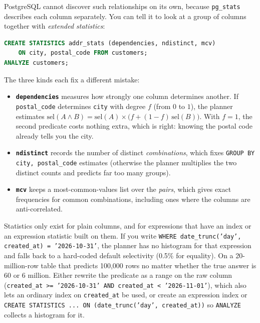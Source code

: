 PostgreSQL cannot discover such relationships on its own, because \texttt{pg\_stats} describes each column separately. You can tell it to look at a group of columns together with \emph{extended statistics}:

\begin{lstlisting}[language=SQL]
CREATE STATISTICS addr_stats (dependencies, ndistinct, mcv)
    ON city, postal_code FROM customers;
ANALYZE customers;
\end{lstlisting}

The three kinds each fix a different mistake:
\begin{itemize}
  \item \textbf{\texttt{dependencies}} measures how strongly one column determines another. If \texttt{postal\_code} determines \texttt{city} with degree $f$ (from $0$ to $1$), the planner estimates $\text{sel}(A \land B) = \text{sel}(A) \times \big(f + (1 - f)\,\text{sel}(B)\big)$. With $f = 1$, the second predicate costs nothing extra, which is right: knowing the postal code already tells you the city.
  \item \textbf{\texttt{ndistinct}} records the number of distinct \emph{combinations}, which fixes \texttt{GROUP BY city, postal\_code} estimates (otherwise the planner multiplies the two distinct counts and predicts far too many groups).
  \item \textbf{\texttt{mcv}} keeps a most-common-values list over the \emph{pairs}, which gives exact frequencies for common combinations, including ones where the columns are anti-correlated.
\end{itemize}

\begin{trapbox}
Statistics only exist for plain columns, and for expressions that have an index or an expression statistic built on them. If you write \texttt{WHERE date\_trunc('day', created\_at) = '2026-10-31'}, the planner has no histogram for that expression and falls back to a hard-coded default selectivity (0.5\% for equality). On a 20-million-row table that predicts 100,000 rows no matter whether the true answer is 60 or 6 million. Either rewrite the predicate as a range on the raw column (\texttt{created\_at >= '2026-10-31' AND created\_at < '2026-11-01'}), which also lets an ordinary index on \texttt{created\_at} be used, or create an expression index or \texttt{CREATE STATISTICS ... ON (date\_trunc('day', created\_at))} so \texttt{ANALYZE} collects a histogram for it.
\end{trapbox}

